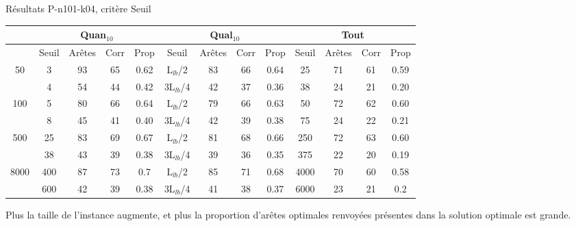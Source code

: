 \documentclass{beamer}
\begin{document}
\begin{frame}{Résultats P-n101-k04, critère Seuil}

\begin{table}[H]

\begin{tabular}{|@{}c@{}|@{}c@{}|@{}c@{}|@{}c@{}|@{}c@{}||@{}c@{}|@{}c@{}|@{}c@{}|@{}c@{}||@{}c@{}|@{}c@{}|@{}c@{}|@{}c@{}|}

\hline
 & \multicolumn{4}{c|}{Quan$_{10}$} & \multicolumn{4}{c|}{Qual$_{10}$} & \multicolumn{4}{c|}{Tout} \\
 \hline
 & Seuil & Arêtes & Corr & Prop & Seuil & Arêtes & Corr & Prop & Seuil & Arêtes & Corr & Prop \\
 \hline
 50 & 3 & 93 & 65 & 0.62 & L$_{lb}$/2 & 83 & 66 & 0.64 & 25 & 71 & 61 & 0.59 \\
 \cline{2-13} 
    & 4 & 54 & 44 & 0.42 & 3L$_{lb}$/4 & 42 & 37 & 0.36 & 38 & 24 & 21 & 0.20  \\
  \hline
   100 & 5 & 80 & 66 & 0.64 & L$_{lb}$/2 & 79 & 66 & 0.63 & 50 & 72 & 62 & 0.60 \\
 \cline{2-13} 
    & 8 & 45 & 41 & 0.40 & 3L$_{lb}$/4 & 42 & 39 & 0.38 & 75 & 24 & 22 & 0.21 \\
  \hline
   500 & 25 & 83 & 69 & 0.67 & L$_{lb}$/2 & 81 & 68 & 0.66 & 250 & 72 & 63 & 0.60 \\
 \cline{2-13} 
    & 38 & 43 & 39 & 0.38 & 3L$_{lb}$/4 & 39 & 36 & 0.35 & 375 & 22 & 20 & 0.19 \\
  \hline
   8000 & 400 & 87 & 73 & 0.7 & L$_{lb}$/2 & 85 & 71 & 0.68 & 4000 & 70 & 60 & 0.58 \\
 \cline{2-13} 
    & 600 & 42 & 39 & 0.38 & 3L$_{lb}$/4 & 41 & 38 & 0.37 & 6000 & 23 & 21 & 0.2 \\
  \hline

\end{tabular}


\end{table}

Plus la taille de l'instance augmente, et plus la proportion d'arêtes optimales  renvoyées présentes dans la solution optimale est grande.

\end{frame}
\end{document}
